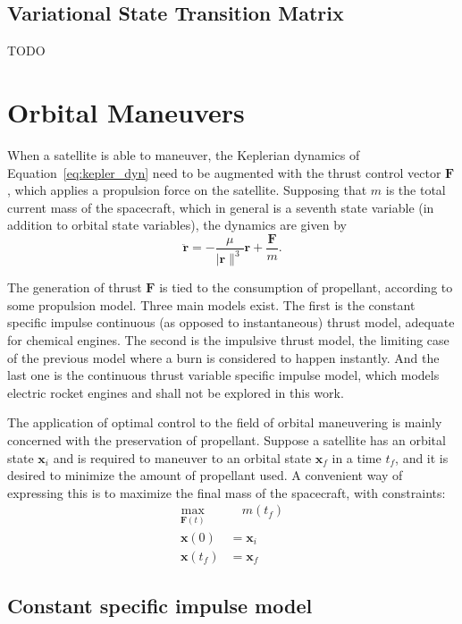 \subsection{Variational State Transition Matrix}

TODO

\section{Orbital Maneuvers}

When a satellite is able to maneuver, the Keplerian dynamics of Equation~\eqref{eq:kepler_dyn} need to be augmented with the thrust control vector \(\mathbf{F}\), which applies a propulsion force on the satellite. Supposing that \(m\) is the total current mass of the spacecraft, which in general is a seventh state variable (in addition to orbital state variables), the dynamics are given by
\begin{equation}
    \ddot{\mathbf{r}} = -\frac{\mu}{\lvert \mathbf{r} \rVert^3}\mathbf{r} + \frac{\mathbf{F}}{m}.
\end{equation}

The generation of thrust \(\mathbf{F}\) is tied to the consumption of propellant, according to some propulsion model. Three main models exist. The first is the constant specific impulse continuous (as opposed to instantaneous) thrust model, adequate for chemical engines. The second is the impulsive thrust model, the limiting case of the previous model where a burn is considered to happen instantly. And the last one is the continuous thrust variable specific impulse model, which models electric rocket engines and shall not be explored in this work.

The application of optimal control to the field of orbital maneuvering is mainly concerned with the preservation of propellant. Suppose a satellite has an orbital state \(\mathbf{x}_i\) and is required to maneuver to an orbital state \(\mathbf{x}_f\) in a time \(t_f\), and it is desired to minimize the amount of propellant used. A convenient way of expressing this is to maximize the final mass of the spacecraft, with constraints:
\begin{align}
    \max_{\mathbf{F}(t)}&\quad m(t_f) \label{eq:max_final_mass} \\
    \mathbf{x}(0) &= \mathbf{x}_i \\
    \mathbf{x}(t_f) &= \mathbf{x}_f
\end{align}

\subsection{Constant specific impulse model}

